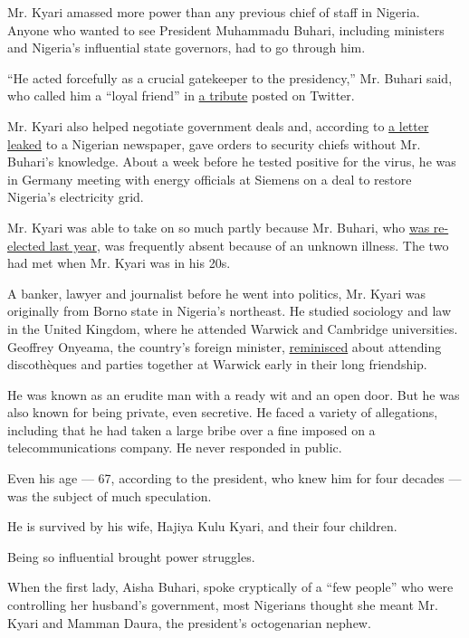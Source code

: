 Mr. Kyari amassed more power than any previous chief of staff in
Nigeria. Anyone who wanted to see President Muhammadu Buhari, including
ministers and Nigeria's influential state governors, had to go through
him.

``He acted forcefully as a crucial gatekeeper to the presidency,'' Mr.
Buhari said, who called him a ``loyal friend'' in
\href{https://twitter.com/MBuhari/status/1251567643909337089}{a tribute}
posted on Twitter.

Mr. Kyari also helped negotiate government deals and, according to
\href{https://www.premiumtimesng.com/news/headlines/377757-updated-exclusive-buharis-team-in-disarray-as-nsa-monguno-declares-war-on-abba-kyari.html}{a
letter leaked} to a Nigerian newspaper, gave orders to security chiefs
without Mr. Buhari's knowledge. About a week before he tested positive
for the virus, he was in Germany meeting with energy officials at
Siemens on a deal to restore Nigeria's electricity grid.

Mr. Kyari was able to take on so much partly because Mr. Buhari, who
\href{https://www.nytimes3xbfgragh.onion/2019/02/26/world/africa/nigeria-election-results.html}{was
re-elected last year}, was frequently absent because of an unknown
illness. The two had met when Mr. Kyari was in his 20s.

A banker, lawyer and journalist before he went into politics, Mr. Kyari
was originally from Borno state in Nigeria's northeast. He studied
sociology and law in the United Kingdom, where he attended Warwick and
Cambridge universities. Geoffrey Onyeama, the country's foreign
minister,
\href{https://www.youtube.com/watch?v=j_Q3uGqR3-s\&feature=youtu.be}{reminisced}
about attending discothèques and parties together at Warwick early in
their long friendship.

He was known as an erudite man with a ready wit and an open door. But he
was also known for being private, even secretive. He faced a variety of
allegations, including that he had taken a large bribe over a fine
imposed on a telecommunications company. He never responded in public.

Even his age --- 67, according to the president, who knew him for four
decades --- was the subject of much speculation.

He is survived by his wife, Hajiya Kulu Kyari, and their four children.

Being so influential brought power struggles.

When the first lady, Aisha Buhari, spoke cryptically of a ``few people''
who were controlling her husband's government, most Nigerians thought
she meant Mr. Kyari and Mamman Daura, the president's octogenarian
nephew.

